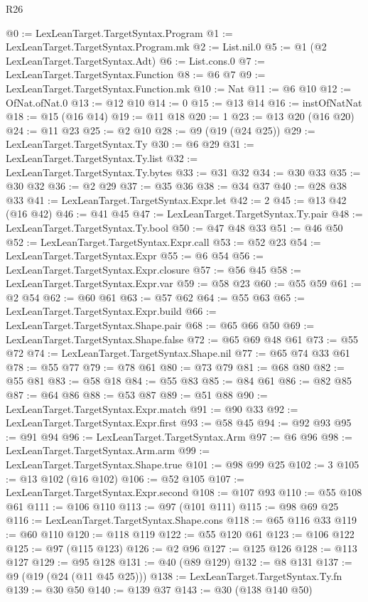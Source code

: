 \begin{lexlean}{R26}
\begin{coremodule}
{{{{{{{{{{{{{{{@0 := LexLeanTarget.TargetSyntax.Program
@1 := LexLeanTarget.TargetSyntax.Program.mk
@2 := List.nil.{0}
@5 := @1 (@2 LexLeanTarget.TargetSyntax.Adt)
@6 := List.cons.{0}
@7 := LexLeanTarget.TargetSyntax.Function
@8 := @6 @7
@9 := LexLeanTarget.TargetSyntax.Function.mk
@10 := Nat
@11 := @6 @10
@12 := OfNat.ofNat.{0}
@13 := @12 @10
@14 := 0
@15 := @13 @14
@16 := instOfNatNat
@18 := @15 (@16 @14)
@19 := @11 @18
@20 := 1
@23 := @13 @20 (@16 @20)
@24 := @11 @23
@25 := @2 @10
@28 := @9 (@19 (@24 @25))
@29 := LexLeanTarget.TargetSyntax.Ty
@30 := @6 @29
@31 := LexLeanTarget.TargetSyntax.Ty.list
@32 := LexLeanTarget.TargetSyntax.Ty.bytes
@33 := @31 @32
@34 := @30 @33
@35 := @30 @32
@36 := @2 @29
@37 := @35 @36
@38 := @34 @37
@40 := @28 @38 @33
@41 := LexLeanTarget.TargetSyntax.Expr.let
@42 := 2
@45 := @13 @42 (@16 @42)
@46 := @41 @45
@47 := LexLeanTarget.TargetSyntax.Ty.pair
@48 := LexLeanTarget.TargetSyntax.Ty.bool
@50 := @47 @48 @33
@51 := @46 @50
@52 := LexLeanTarget.TargetSyntax.Expr.call
@53 := @52 @23
@54 := LexLeanTarget.TargetSyntax.Expr
@55 := @6 @54
@56 := LexLeanTarget.TargetSyntax.Expr.closure
@57 := @56 @45
@58 := LexLeanTarget.TargetSyntax.Expr.var
@59 := @58 @23
@60 := @55 @59
@61 := @2 @54
@62 := @60 @61
@63 := @57 @62
@64 := @55 @63
@65 := LexLeanTarget.TargetSyntax.Expr.build
@66 := LexLeanTarget.TargetSyntax.Shape.pair
@68 := @65 @66 @50
@69 := LexLeanTarget.TargetSyntax.Shape.false
@72 := @65 @69 @48 @61
@73 := @55 @72
@74 := LexLeanTarget.TargetSyntax.Shape.nil
@77 := @65 @74 @33 @61
@78 := @55 @77
@79 := @78 @61
@80 := @73 @79
@81 := @68 @80
@82 := @55 @81
@83 := @58 @18
@84 := @55 @83
@85 := @84 @61
@86 := @82 @85
@87 := @64 @86
@88 := @53 @87
@89 := @51 @88
@90 := LexLeanTarget.TargetSyntax.Expr.match
@91 := @90 @33
@92 := LexLeanTarget.TargetSyntax.Expr.first
@93 := @58 @45
@94 := @92 @93
@95 := @91 @94
@96 := LexLeanTarget.TargetSyntax.Arm
@97 := @6 @96
@98 := LexLeanTarget.TargetSyntax.Arm.arm
@99 := LexLeanTarget.TargetSyntax.Shape.true
@101 := @98 @99 @25
@102 := 3
@105 := @13 @102 (@16 @102)
@106 := @52 @105
@107 := LexLeanTarget.TargetSyntax.Expr.second
@108 := @107 @93
@110 := @55 @108 @61
@111 := @106 @110
@113 := @97 (@101 @111)
@115 := @98 @69 @25
@116 := LexLeanTarget.TargetSyntax.Shape.cons
@118 := @65 @116 @33
@119 := @60 @110
@120 := @118 @119
@122 := @55 @120 @61
@123 := @106 @122
@125 := @97 (@115 @123)
@126 := @2 @96
@127 := @125 @126
@128 := @113 @127
@129 := @95 @128
@131 := @40 (@89 @129)
@132 := @8 @131
@137 := @9 (@19 (@24 (@11 @45 @25)))
@138 := LexLeanTarget.TargetSyntax.Ty.fn
@139 := @30 @50
@140 := @139 @37
@143 := @30 (@138 @140 @50)
}}}}}}}}}}}}}}}
\end{coremodule}
\end{lexlean}
